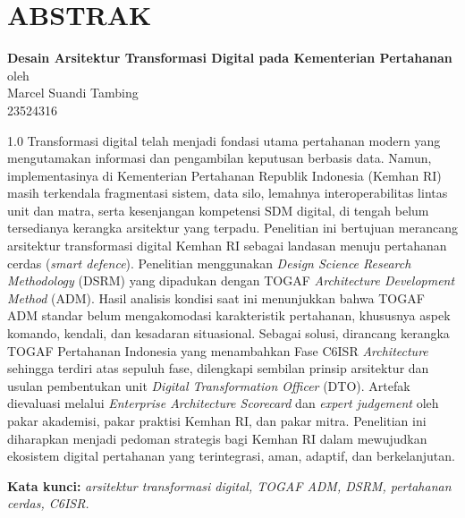 \chapter*{ABSTRAK}

\begin{center}

    \textbf{Desain Arsitektur Transformasi Digital pada Kementerian Pertahanan} \\
    \vspace{0.4cm}
    oleh \\
    \vspace{0.4cm}
    Marcel Suandi Tambing\\
    23524316\\
\end{center}


\begin{spacing}{1.0}
Transformasi digital telah menjadi fondasi utama pertahanan modern yang
mengutamakan informasi dan pengambilan keputusan berbasis data. Namun,
implementasinya di Kementerian Pertahanan Republik Indonesia (Kemhan RI) masih
terkendala fragmentasi sistem, data silo, lemahnya interoperabilitas lintas unit dan
matra, serta kesenjangan kompetensi SDM digital, di tengah belum tersedianya
kerangka arsitektur yang terpadu. Penelitian ini bertujuan merancang arsitektur
transformasi digital Kemhan RI sebagai landasan menuju pertahanan cerdas
(\textit{smart defence}). Penelitian menggunakan \textit{Design Science Research Methodology}
(DSRM) yang dipadukan dengan TOGAF \textit{Architecture Development Method} (ADM).
Hasil analisis kondisi saat ini menunjukkan bahwa TOGAF ADM standar belum
mengakomodasi karakteristik pertahanan, khususnya aspek komando, kendali, dan
kesadaran situasional. Sebagai solusi, dirancang kerangka TOGAF Pertahanan
Indonesia yang menambahkan Fase C6ISR \textit{Architecture} sehingga terdiri atas sepuluh
fase, dilengkapi sembilan prinsip arsitektur dan usulan pembentukan unit
\textit{Digital Transformation Officer} (DTO). Artefak dievaluasi melalui
\textit{Enterprise Architecture Scorecard}\texttrademark{} dan \textit{expert judgement} oleh
pakar akademisi, pakar praktisi Kemhan RI, dan pakar mitra.
Penelitian ini diharapkan menjadi pedoman strategis bagi Kemhan RI dalam
mewujudkan ekosistem digital pertahanan yang terintegrasi, aman, adaptif, dan
berkelanjutan.

\vspace{0.4cm}
\noindent\textbf{Kata kunci:} \textit{arsitektur transformasi digital, TOGAF ADM, DSRM, pertahanan cerdas, C6ISR.}
\end{spacing}